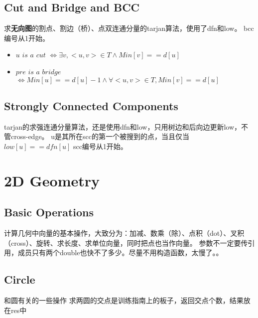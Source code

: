 \documentclass[twoside, UTF8]{article}
\begin{document}
		\subsection{Cut and Bridge and BCC}
			\begin{flushleft}
				求\textbf{无向图}的割点、割边（桥）、点双连通分量的tarjan算法，使用了dfn和low。
				\linebreak bcc编号从1开始。
			\end{flushleft}
			
			\begin{itemize}
				\item $u$ $is$ $a$ $cut$ $\Leftrightarrow \exists v, <u, v> \in T \wedge Min[v] == d[u]$
				\item $pre$ $is$ $a$ $bridge$ $\Leftrightarrow Min[u] == d[u] - 1 \wedge \forall <u, v> \in T, Min[v] == d[u]$
			\end{itemize}
		\newpage
		\subsection{Strongly Connected Components}
			\begin{flushleft}
				tarjan的求强连通分量算法，还是使用dfn和low，只用树边和后向边更新low，不管cross-edge。
				\linebreak u是其所在scc的第一个被搜到的点，当且仅当$low[u] == dfn[u]$
				\linebreak scc编号从1开始。
			\end{flushleft}
			
	\newpage
	\section{2D Geometry}
		\subsection{Basic Operations}
			\begin{flushleft}
				计算几何中向量的基本操作，大致分为：加减、数乘（除）、点积（dot）、叉积（cross）、旋转、求长度、求单位向量，同时把点也当作向量。
				\linebreak 参数不一定要传引用，成员只有两个double也快不了多少。尽量不用构造函数，太慢了。。
			\end{flushleft}
			
		\subsection{Circle}
			\begin{flushleft}
				和圆有关的一些操作
				\linebreak 求两圆的交点是训练指南上的板子，返回交点个数，结果放在res中
			\end{flushleft}
			
	\newpage
\end{document}
